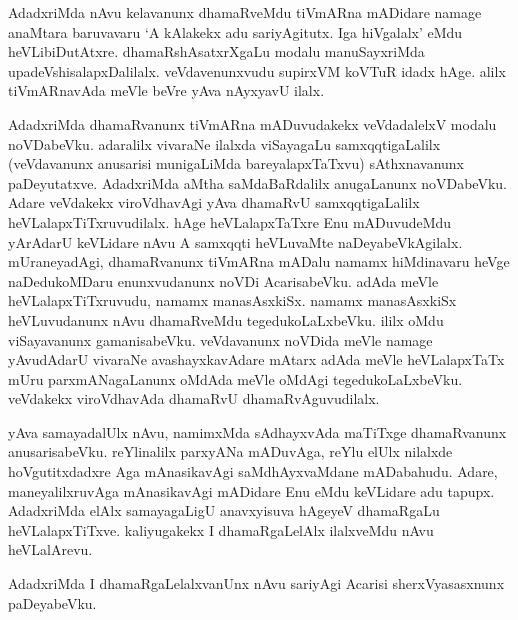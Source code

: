 AdadxriMda nAvu kelavanunx dhamaRveMdu tiVmARna mADidare namage anaMtara baruvavaru `A kAlakekx adu sariyAgitutx. Iga hiVgalalx' eMdu heVLibiDutAtxre. dhamaRshAsatxrXgaLu modalu manuSayxriMda upadeVshisalapxDalilalx. veVdavenunxvudu supirxVM koVTuR idadx hAge. alilx tiVmARnavAda meVle beVre yAva nAyxyavU ilalx.

AdadxriMda dhamaRvanunx tiVmARna mADuvudakekx veVdadalelxV modalu noVDabeVku. adaralilx vivaraNe ilalxda viSayagaLu samxqqtigaLalilx (veVdavanunx anusarisi munigaLiMda bareyalapxTaTxvu) sAthxnavanunx paDeyutatxve. AdadxriMda aMtha saMdaBaRdalilx anugaLanunx noVDabeVku. Adare veVdakekx viroVdhavAgi yAva dhamaRvU samxqqtigaLalilx heVLalapxTiTxruvudilalx. hAge heVLalapxTaTxre Enu mADuvudeMdu yArAdarU keVLidare nAvu A samxqqti heVLuvaMte naDeyabeVkAgilalx. mUraneyadAgi, dhamaRvanunx tiVmARna mADalu namamx hiMdinavaru heVge naDedukoMDaru enunxvudanunx noVDi AcarisabeVku. adAda meVle heVLalapxTiTxruvudu, namamx manasAsxkiSx. namamx manasAsxkiSx heVLuvudanunx nAvu dhamaRveMdu tegedukoLaLxbeVku. ililx oMdu viSayavanunx gamanisabeVku. veVdavanunx noVDida meVle namage yAvudAdarU vivaraNe avashayxkavAdare mAtarx adAda meVle heVLalapxTaTx mUru parxmANagaLanunx oMdAda meVle oMdAgi tegedukoLaLxbeVku. veVdakekx viroVdhavAda dhamaRvU dhamaRvAguvudilalx.

 yAva samayadalUlx nAvu, namimxMda sAdhayxvAda maTiTxge dhamaRvanunx anusarisabeVku. reYlinalilx parxyANa mADuvAga, reYlu elUlx nilalxde hoVgutitxdadxre Aga mAnasikavAgi saMdhAyxvaMdane mADabahudu. Adare, maneyalilxruvAga mAnasikavAgi mADidare Enu eMdu keVLidare adu tapupx. AdadxriMda elAlx samayagaLigU anavxyisuva hAgeyeV dhamaRgaLu heVLalapxTiTxve. kaliyugakekx I dhamaRgaLelAlx ilalxveMdu nAvu heVLalArevu.

AdadxriMda I dhamaRgaLelalxvanUnx nAvu sariyAgi Acarisi sherxVyasasxnunx paDeyabeVku.
